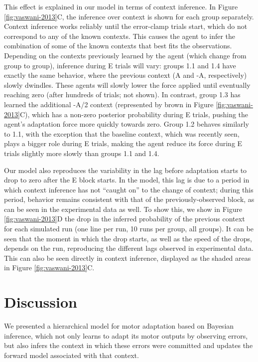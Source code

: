 \documentclass[a4paper,doc,floatsintext,natbib]{apa6}
\def \fref #1{Figure \ref{#1}}     %
\begin{document}
This effect is explained in our model in terms of context inference. In \fref{fig:vaswani-2013}C, the inference over context is shown for each group separately. Context inference works reliably until the error-clamp trials start, which do not correspond to any of the known contexts. This causes the agent to infer the combination of some of the known contexts that best fits the observations. Depending on the contexts previously learned by the agent (which change from group to group), inference during E trials will vary: groups 1.1 and 1.4 have exactly the same behavior, where the previous context (A and -A, respectively) slowly dwindles. These agents will slowly lower the force applied until eventually reaching zero (after hundreds of trials; not shown). In contrast, group 1.3 has learned the additional -A/2 context (represented by brown in \fref{fig:vaswani-2013}C), which has a non-zero posterior probability during E trials, pushing the agent's adaptation force more quickly towards zero. Group 1.2 behaves similarly to 1.1, with the exception that the baseline context, which was recently seen, plays a bigger role during E trials, making the agent reduce its force during E trials slightly more slowly than groups 1.1 and 1.4.

Our model also reproduces the variability in the lag before adaptation starts to drop to zero after the E block starts. In the model, this lag is due to a period in which context inference has not ``caught on'' to the change of context; during this period, behavior remains consistent with that of the previously-observed block, as can be seen in the experimental data as well. To show this, we show in \fref{fig:vaswani-2013}D the drop in the inferred probability of the previous context for each simulated run (one line per run, 10 runs per group, all groups). It can be seen that the moment in which the drop starts, as well as the speed of the drops, depends on the run, reproducing the different lags observed in experimental data. This can also be seen directly in context inference, displayed as the shaded areas in \fref{fig:vaswani-2013}C.


\section{Discussion}
We presented a hierarchical model for motor adaptation based on Bayesian inference, which not only learns to adapt its motor outputs by observing errors, but also infers the context in which these errors were committed and updates the forward model associated with that context.
\end{document}
